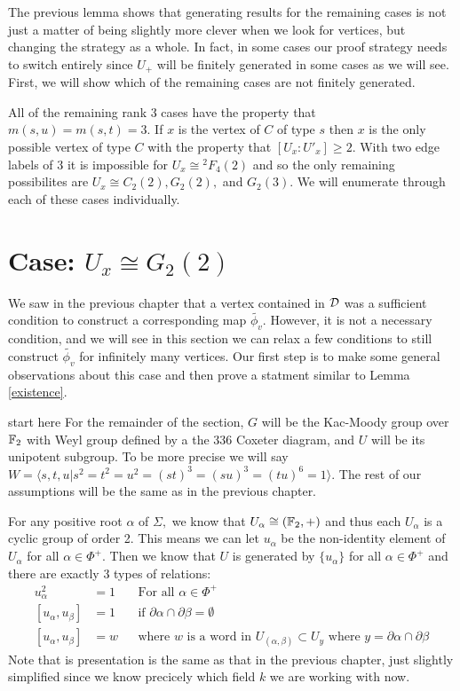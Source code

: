 \documentclass[class=book, crop=false]{standalone}
\begin{document}
The previous lemma shows that generating results for the remaining cases is not just a matter of being slightly more clever when we look for vertices, but changing the strategy as a whole. In fact, in some cases our proof strategy needs to switch entirely since $U_+$ will be finitely generated in some cases as we will see. First, we will show which of the remaining cases are not finitely generated.

All of the remaining rank 3 cases have the property that $m(s,u)=m(s,t)=3.$ If $x$ is the vertex of $C$ of type $s$ then $x$ is the only possible vertex of type $C$ with the property that $[U_x:U'_x]\ge 2.$ With two edge labels of $3$ it is impossible for $U_x\cong {}^2F_4(2)$ and so the only remaining possibilites are $U_x\cong C_2(2),G_2(2),$ and $G_2(3).$ We will enumerate through each of these cases individually.

\section{Case: $U_x\cong G_2(2)$}
We saw in the previous chapter that a vertex contained in $\mathcal{D}$ was a sufficient condition to construct a corresponding map $\tilde{\phi_v}.$ However, it is not a necessary condition, and we will see in this section we can relax a few conditions to still construct $\tilde{\phi_v}$ for infinitely many vertices. Our first step is to make some general observations about this case and then prove a statment similar to Lemma \ref{existence}.

\Huge start here \normalsize
For the remainder of the section, $G$ will be the Kac-Moody group over $\mathbb{F}_{2}$ with Weyl group defined by a the 336 Coxeter diagram, and $U$ will be its unipotent subgroup. To be more precise we will say $W=\langle s,t,u|s^2=t^2=u^2=(st)^3=(su)^3=(tu)^6=1\rangle.$ The rest of our assumptions will be the same as in the previous chapter.

For any positive root $\alpha$ of $\Sigma,$ we know that $U_\alpha\cong (\mathbb{F}_{2},+)$ and thus each $U_\alpha$ is a cyclic group of order 2. This means we can let $u_\alpha$ be the non-identity element of $U_\alpha$ for all $\alpha\in \Phi^+.$ Then we know that $U$ is generated by $\{u_\alpha\}$ for all $\alpha\in \Phi^+$ and there are exactly 3 types of relations:
\begin{align*}
	u_\alpha^2&=1&&\text{For all }\alpha\in \Phi^+\\
[u_\alpha,u_\beta]&=1&&\text{if }\partial\alpha\cap \partial\beta=\emptyset\\
[u_\alpha,u_\beta]&=w&&\text{where }w\text{ is a word in }U_{(\alpha,\beta)}\subset U_y\text{ where }y=\partial\alpha\cap \partial\beta
\end{align*}
Note that is presentation is the same as that in the previous chapter, just slightly simplified since we know precicely which field $k$ we are working with now.
\end{document}
